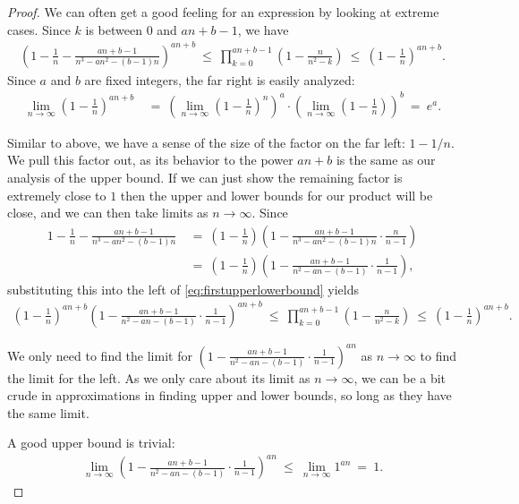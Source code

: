 \documentclass[12pt,reqno]{amsart}
\numberwithin{equation}{section}
\theoremstyle{plain}
\begin{document}
\begin{proof}
We can often get a good feeling for an expression by looking at extreme cases. Since $k$ is between 0 and $an+b-1$, we have
\begin{align}\label{eq:firstupperlowerbound}
   \left(1-\frac{1}{n} - \frac{an+b-1}{n^3 - an^2 - (b-1)n}\right)^{an+b} \ \leq\ \prod_{k=0}^{an+b-1}\left(1-\frac{n}{n^2 - k}\right) \ \le \  \left(1-\frac{1}{n}\right)^{an+b}.
\end{align}
Since $a$ and $b$ are fixed integers, the far right is easily analyzed:
\begin{align}
  \lim_{n\rightarrow \infty}\left(1-\frac{1}{n}\right)^{an+b} &\ = \  \left(\lim_{n\rightarrow\infty} \left(1-\frac{1}{n}\right)^{n}\right)^a  \cdot  \left(\lim_{n\rightarrow \infty} \left(1-\frac{1}{n}\right)\right)^b \ = \ e^a.
\end{align}

Similar to above, we have a sense of the size of the factor on the far left: $1 - 1/n$. We pull this factor out, as its behavior to the power $an+b$ is the same as our analysis of the upper bound. If we can just show the remaining factor is extremely close to $1$ then the upper and lower bounds for our product will be close, and we can then take limits as $n\to\infty$. Since
\begin{align}
    1-\frac{1}{n} - \frac{an+b-1}{n^3 - an^2 - (b-1)n} &\ = \  \left(1-\frac{1}{n}\right)\left(1 - \frac{an+b-1}{n^3 - an^2 - (b-1)n} \cdot \frac{n}{n-1}\right)\nonumber\\
    &\ = \  \left(1-\frac{1}{n}\right)\left(1 - \frac{an+b-1}{n^2 - an -
    (b-1)} \cdot \frac{1}{n-1}\right),
\end{align}
substituting this into the left of \eqref{eq:firstupperlowerbound} yields
\begin{align}
   \left(1-\frac{1}{n}\right)^{an+b}\left(1 - \frac{an+b-1}{n^2 - an -
    (b-1)} \cdot \frac{1}{n-1}\right)^{an+b}  \ \le \   \prod_{k=0}^{an+b-1}\left(1-\frac{n}{n^2 - k}\right) \ \le \  \left(1-\frac{1}{n}\right)^{an+b}.
\end{align}

We only need to find the limit for $\left(1 - \frac{an+b-1}{n^2 - an - (b-1)} \cdot \frac{1}{n-1}\right)^{an}$ as $n\rightarrow \infty$ to find the limit for the left. As we only care about its limit as $n\to\infty$, we can be a bit crude in approximations in finding upper and lower bounds, so long as they have the same limit.

A good upper bound is trivial:
\begin{align}
   \lim_{n\rightarrow \infty}\left(1 - \frac{an+b-1}{n^2 - an -
    (b-1)} \cdot \frac{1}{n-1}\right)^{an} \ \le \  \lim_{n\rightarrow \infty} 1^{an}\ =\ 1.
\end{align}


\end{proof}
\end{document}
